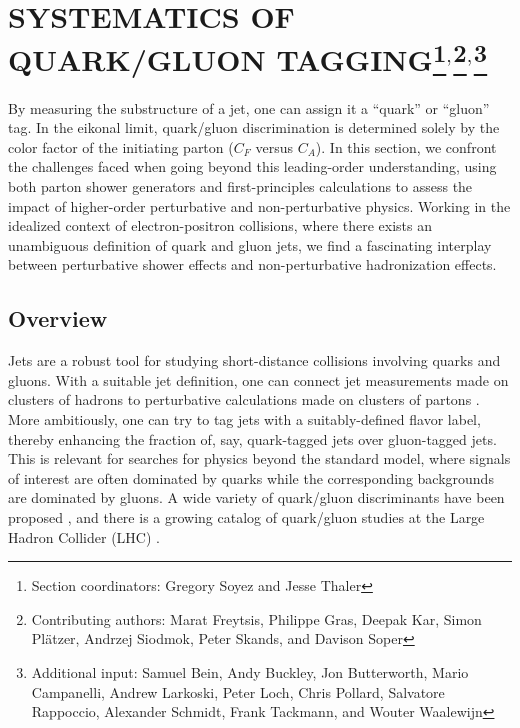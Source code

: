 \documentclass[11pt]{cernrep}
\begin{document}
\section{SYSTEMATICS OF QUARK/GLUON TAGGING\protect\footnote{Section coordinators: Gregory Soyez and Jesse Thaler}$^{,}$\protect\footnote{Contributing authors: Marat Freytsis, Philippe Gras, Deepak Kar, Simon Pl\"atzer, Andrzej Siodmok, Peter Skands, and Davison Soper}$^{,}$\protect\footnote{Additional input: Samuel Bein, Andy Buckley, Jon Butterworth, Mario Campanelli, Andrew Larkoski, Peter Loch, Chris Pollard, Salvatore Rappoccio, Alexander Schmidt, Frank Tackmann, and Wouter Waalewijn}}

By measuring the substructure of a jet, one can assign it a ``quark'' or ``gluon'' tag.  In the eikonal limit, quark/gluon discrimination is determined solely by the color factor of the initiating parton ($C_F$ versus $C_A$).  In this section, we confront the challenges faced when going beyond this leading-order understanding, using both parton shower generators and first-principles calculations to assess the impact of higher-order perturbative and non-perturbative physics.  Working in the idealized context of electron-positron collisions, where there exists an unambiguous definition of quark and gluon jets, we find a fascinating interplay between perturbative shower effects and non-perturbative hadronization effects.

\subsection{Overview}
\label{quarkgluon_sec:overview}

Jets are a robust tool for studying short-distance collisions involving quarks and gluons.  With a suitable jet definition, one can connect jet measurements made on clusters of hadrons to perturbative calculations made on clusters of partons \cite{}.  More ambitiously, one can try to tag jets with a suitably-defined flavor label, thereby enhancing the fraction of, say, quark-tagged jets over gluon-tagged jets.  This is relevant for searches for physics beyond the standard model, where signals of interest are often dominated by quarks while the corresponding backgrounds are dominated by gluons.  A wide variety of quark/gluon discriminants have been proposed \cite{}, and there is a growing catalog of quark/gluon studies at the Large Hadron Collider (LHC) \cite{}.
\end{document}
